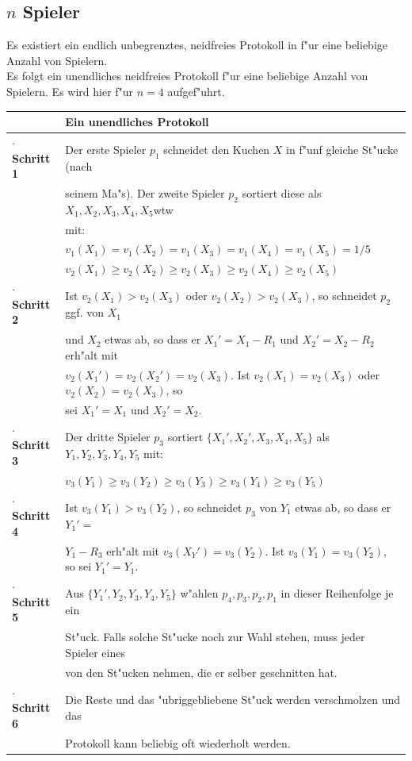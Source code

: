 \documentclass[11pt, a4paper, twoside]{article}
\newcommand{\wf}{\color{white}}
\newcommand{\tf}{\color{black}}
\numberwithin{equation}{section}
\begin{document}
\subsection{$n$ Spieler}
Es existiert ein endlich unbegrenztes, neidfreies Protokoll in \cite{5} f"ur eine beliebige Anzahl von Spielern.\\
Es folgt ein unendliches neidfreies Protokoll f"ur eine beliebige Anzahl von Spielern. Es wird hier f"ur $n=4$ aufgef"uhrt.\\
\newline
\begin{tabular}{|ll|}
\hline
&\textbf{Ein unendliches Protokoll}\\
\hline
\textbf{$\cdot$ Schritt 1}&Der erste Spieler $p_1$ schneidet den Kuchen $X$ in f"unf gleiche St"ucke (nach\\&seinem Ma"s). Der zweite Spieler $p_2$ sortiert diese als $X_1,X_2,X_3,X_4,X_5$\wf wtw\tf\\& mit:\\
&$v_1(X_1)=v_1(X_2)=v_1(X_3)=v_1(X_4)=v_1(X_5)=1/5$\\&$v_2(X_1) \geq v_2(X_2) \geq v_2(X_3)\geq v_2(X_4)\geq v_2(X_5)$\\
\textbf{$\cdot$ Schritt 2}&Ist $v_2(X_1)>v_2(X_3)$ oder $v_2(X_2)> v_2(X_3)$, so schneidet $p_2$ ggf. von $X_1$\\&und $X_2$ etwas ab, so dass er $X_1'=X_1-R_1$ und $X_2'=X_2-R_2$ erh"alt mit   \\&$v_2(X_1')=v_2(X_2')=v_2(X_3)$. Ist $v_2(X_1)=v_2(X_3)$ oder $v_2(X_2)=v_2(X_3)$, so\\&sei $X_1'=X_1$ und $X_2'=X_2$.\\
\textbf{$\cdot$ Schritt 3}&Der dritte Spieler $p_3$ sortiert $\{X_1',X_2',X_3,X_4,X_5\}$ als $Y_1,Y_2,Y_3,Y_4,Y_5$ mit:\\
&$v_3(Y_1) \geq v_3(Y_2) \geq v_3(Y_3)\geq v_3(Y_4)\geq v_3(Y_5)$\\
\textbf{$\cdot$ Schritt 4}&Ist $v_3(Y_1)>v_3(Y_2)$, so schneidet $p_3$ von $Y_1$ etwas ab, so dass er $Y_1'=$\\&$Y_1-R_3$ erh"alt mit $v_3(X_Y')=v_3(Y_2)$. Ist $v_3(Y_1)=v_3(Y_2)$, so sei  $Y_1'=Y_1$.\\
\textbf{$\cdot$ Schritt 5}&Aus $\{Y_1',Y_2,Y_3,Y_4,Y_5\}$ w"ahlen $p_4,p_3,p_2,p_1$ in dieser Reihenfolge je ein\\&St"uck. Falls solche St"ucke noch zur Wahl stehen, muss jeder Spieler eines\\&von den St"ucken nehmen, die er selber geschnitten hat.\\
\textbf{$\cdot$ Schritt 6}&Die Reste und das "ubriggebliebene St"uck werden verschmolzen und das\\&Protokoll kann beliebig oft wiederholt werden.\\
\hline
\end{tabular}
\end{document}
